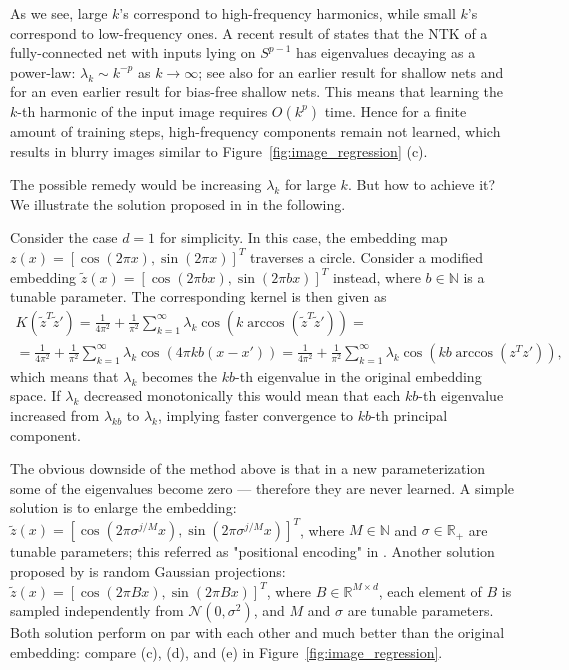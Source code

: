 \documentclass{article}
\newcommand{\RR}{\mathbb{R}}
\newcommand{\NN}{\mathcal{N}}
\begin{document}
    As we see, large $k$'s correspond to high-frequency harmonics, while small $k$'s correspond to low-frequency ones.
    A recent result of \cite{chen2020deep} states that the NTK of a fully-connected net with inputs lying on $S^{p-1}$ has eigenvalues decaying as a power-law: $\lambda_k \sim k^{-p}$ as $k \to \infty$; see also \cite{geifman2020similarity} for an earlier result for shallow nets and \cite{bietti2019inductive} for an even earlier result for bias-free shallow nets.
    This means that learning the $k$-th harmonic of the input image requires $O(k^p)$ time.
    Hence for a finite amount of training steps, high-frequency components remain not learned, which results in blurry images similar to Figure~\ref{fig:image_regression} (c).

    The possible remedy would be increasing $\lambda_k$ for large $k$.
    But how to achieve it?
    We illustrate the solution proposed in \cite{tancik2020fourier} in the following.
    
    Consider the case $d=1$ for simplicity.
    In this case, the embedding map $z(x) = [\cos(2\pi x), \sin(2\pi x)]^T$ traverses a circle.
    Consider a modified embedding $\tilde z(x) = [\cos(2\pi b x), \sin(2\pi b x)]^T$ instead, where $b \in \mathbb{N}$ is a tunable parameter.
    The corresponding kernel is then given as
    \begin{multline}
        K(\tilde z^T \tilde z')
        = \frac{1}{4\pi^2} + \frac{1}{\pi^2} \sum_{k=1}^\infty \lambda_k \cos(k \arccos(\tilde z^T \tilde z'))
        =\\= \frac{1}{4\pi^2} + \frac{1}{\pi^2} \sum_{k=1}^\infty \lambda_k \cos(4\pi k b (x-x'))
        = \frac{1}{4\pi^2} + \frac{1}{\pi^2} \sum_{k=1}^\infty \lambda_k \cos(k b \arccos(z^T z')),
    \end{multline}
    which means that $\lambda_k$ becomes the $kb$-th eigenvalue in the original embedding space.
    If $\lambda_k$ decreased monotonically this would mean that each $kb$-th eigenvalue increased from $\lambda_{kb}$ to $\lambda_k$, implying faster convergence to $kb$-th principal component.

    The obvious downside of the method above is that in a new parameterization some of the eigenvalues become zero --- therefore they are never learned.
    A simple solution is to enlarge the embedding: $\tilde z(x) = [\cos(2\pi \sigma^{j/M} x), \sin(2\pi \sigma^{j/M} x)]^T$, where $M \in \mathbb{N}$ and $\sigma \in \RR_+$ are tunable parameters; this referred as "positional encoding" in \cite{tancik2020fourier}.
    Another solution proposed by \cite{tancik2020fourier} is random Gaussian projections: $\tilde z(x) = [\cos(2\pi B x), \sin(2\pi B x)]^T$, where $B \in \RR^{M \times d}$, each element of $B$ is sampled independently from $\NN(0,\sigma^2)$, and $M$ and $\sigma$ are tunable parameters.
    Both solution perform on par with each other and much better than the original embedding: compare (c), (d), and (e) in Figure~\ref{fig:image_regression}.
\end{document}

